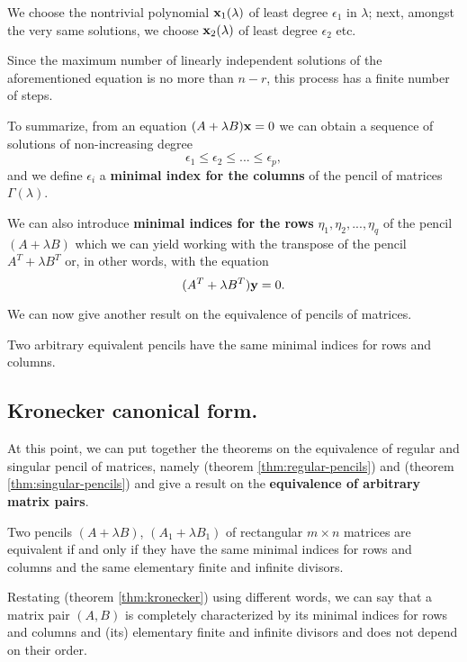 We choose the nontrivial polynomial \(\vb{x}_{1}(\lambda)\) of least degree \(\epsilon_{1}\) in \(\lambda\); next,
amongst the very same solutions, we choose \(\vb{x}_{2}(\lambda)\) of least degree \(\epsilon_{2}\) etc.

Since the maximum number of linearly independent solutions of the aforementioned equation
is no more than \(n - r\), this process has a finite number of steps.

To summarize, from an equation \((A + \lambda B)\vb{x} = 0\) we can obtain a sequence of solutions of non-increasing degree
\[
    \epsilon_{1} \leq \epsilon_{2} \leq ... \leq \epsilon_{p},
\]
and we define \(\epsilon_{i}\) a \textbf{minimal index for the columns} of the pencil of matrices \(\Gamma(\lambda)\).

We can also introduce \textbf{minimal indices for the rows} \(\eta_{1}, \eta_{2}, ..., \eta_{q}\) of the pencil
\((A + \lambda B)\) which we can yield working with the transpose of the pencil \(A^T + \lambda B^T\) or, in other words,
with the equation
\[
    (A^T + \lambda B^T)\vb{y} = 0.
\]

We can now give another result on the equivalence of pencils of matrices.

\begin{theorem}\label{thm:singular-pencils}
    Two arbitrary equivalent pencils have the same minimal indices for rows and columns.
\end{theorem}

\subsection*{Kronecker canonical form.}
At this point, we can put together the theorems on the equivalence of regular and singular pencil of matrices, namely
 (theorem \ref{thm:regular-pencils}) and
 (theorem \ref{thm:singular-pencils}) and give a result on the \textbf{equivalence of
arbitrary matrix pairs}.
\begin{theorem}[Kronecker]\label{thm:kronecker}
    Two pencils \((A + \lambda B)\), \((A_{1} + \lambda B_{1})\) of rectangular \(m \times n\) matrices
    are equivalent if and only if they have the same minimal indices for rows and columns and the same elementary finite and
    infinite divisors.
\end{theorem}

\begin{remark}
    Restating  (theorem \ref{thm:kronecker}) using different words, we can say that a matrix pair
    \((A, B)\) is completely characterized by its minimal indices for rows and columns and (its) elementary finite and
    infinite divisors and does not depend on their order.
\end{remark}

